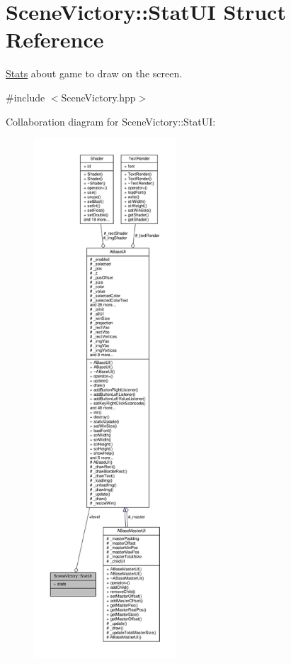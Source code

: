 \hypertarget{struct_scene_victory_1_1_stat_u_i}{}\section{Scene\+Victory\+:\+:Stat\+UI Struct Reference}
\label{struct_scene_victory_1_1_stat_u_i}


\hyperlink{class_stats}{Stats} about game to draw on the screen.  




{\ttfamily \#include $<$Scene\+Victory.\+hpp$>$}



Collaboration diagram for Scene\+Victory\+:\+:Stat\+UI\+:
\nopagebreak
\begin{figure}[H]
\begin{center}
\leavevmode
\includegraphics[height=550pt]{struct_scene_victory_1_1_stat_u_i__coll__graph}
\end{center}
\end{figure}
